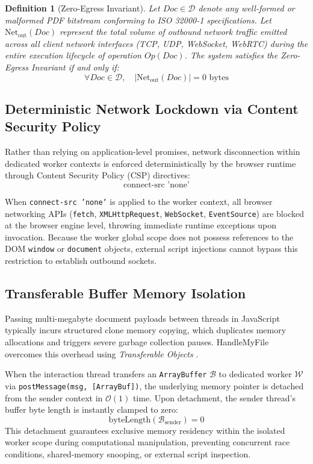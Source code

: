 \documentclass[journal]{IEEEtran}
\newtheorem{definition}{Definition}
\begin{document}
\begin{definition}[Zero-Egress Invariant]
Let $Doc \in \mathcal{D}$ denote any well-formed or malformed PDF bitstream conforming to ISO 32000-1 specifications. Let $\text{Net}_{\text{out}}(Doc)$ represent the total volume of outbound network traffic emitted across all client network interfaces (TCP, UDP, WebSocket, WebRTC) during the entire execution lifecycle of operation $Op(Doc)$. The system satisfies the Zero-Egress Invariant if and only if:
\begin{equation}
\forall Doc \in \mathcal{D}, \quad |\text{Net}_{\text{out}}(Doc)| = 0 \text{ bytes}
\end{equation}
\end{definition}

\subsection{Deterministic Network Lockdown via Content Security Policy}
Rather than relying on application-level promises, network disconnection within dedicated worker contexts is enforced deterministically by the browser runtime through Content Security Policy (CSP) directives:
\begin{equation}
\text{connect-src 'none'}
\end{equation}

When \texttt{connect-src 'none'} is applied to the worker context, all browser networking APIs (\texttt{fetch}, \texttt{XMLHttpRequest}, \texttt{WebSocket}, \texttt{EventSource}) are blocked at the browser engine level, throwing immediate runtime exceptions upon invocation. Because the worker global scope does not possess references to the DOM \texttt{window} or \texttt{document} objects, external script injections cannot bypass this restriction to establish outbound sockets.

\subsection{Transferable Buffer Memory Isolation}
Passing multi-megabyte document payloads between threads in JavaScript typically incurs structured clone memory copying, which duplicates memory allocations and triggers severe garbage collection pauses. HandleMyFile overcomes this overhead using \textit{Transferable Objects} \cite{whatwg2024workers}.

When the interaction thread transfers an \texttt{ArrayBuffer} $\mathcal{B}$ to dedicated worker $\mathcal{W}$ via \texttt{postMessage(msg, [ArrayBuf])}, the underlying memory pointer is detached from the sender context in $\mathcal{O}(1)$ time. Upon detachment, the sender thread's buffer byte length is instantly clamped to zero:
\begin{equation}
\text{byteLength}(\mathcal{B}_{\text{sender}}) = 0
\end{equation}
This detachment guarantees exclusive memory residency within the isolated worker scope during computational manipulation, preventing concurrent race conditions, shared-memory snooping, or external script inspection.
\end{document}
